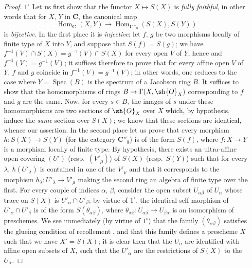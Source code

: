 \begin{proof}
$1^\circ$ Let us first show that the functor $X\mapsto S(X)$ is \emph{fully faithful}, in other words that for $X$, $Y$ in $\mathbf{C}$, the canonical map
\[
  \operatorname{Hom}_{\mathbf{C}}(X,Y)\to\operatorname{Hom}_{\mathbf{C}''_0}(S(X),S(Y))
\]
is \emph{bijective}.
In the first place it is \emph{injective}: let $f$, $g$ be two morphisms locally of finite type of $X$ into $Y$, and suppose that $S(f)=S(g)$; we have $f^{-1}(V)\cap S(X)=g^{-1}(V)\cap S(X)$ for every open $V$ of $Y$, hence  and  $f^{-1}(V)=g^{-1}(V)$; it suffices therefore to prove that for every affine open $V$ of $Y$, $f$ and $g$ coincide in $f^{-1}(V)=g^{-1}(V)$; in other words, one reduces to the case where $Y=\operatorname{Spec}(B)$ is the spectrum of a Jacobson ring $B$.
It suffices  to show that the homomorphisms of rings $B\to\Gamma(X,\sh{O}_X)$ corresponding to $f$ and $g$ are the same.
Now, for every $s\in B$, the images of $s$ under these homomorphisms are two sections of $\sh{O}_X$ over $X$ which, by hypothesis, induce the \emph{same} section over $S(X)$; we know  that these sections are identical, whence our assertion.
In the second place let us prove that every morphism $h:S(X)\to S(Y)$ (for the category $\mathbf{C}''_0$) is of the form $S(f)$, where $f:X\to Y$ is a morphism locally of finite type.
By hypothesis, there exists an ultra-affine open covering $(U')$ (resp.\ $(V'_\mu)$) of $S(X)$ (resp.\ $S(Y)$) such that for every $\lambda$, $h(U'_\lambda)$ is contained in one of the $V'_\mu$ and that it corresponds to the morphism $h_\lambda:U'_\lambda\to V'_\mu$ making the second ring an algebra of finite type over the first.
For every couple of indices $\alpha$, $\beta$, consider the open subset $U_{\alpha\beta}$ of $U_\alpha$ whose trace on $S(X)$ is $U'_\alpha\cap U'_\beta$; by virtue of $1^\circ$, the identical self-morphism of $U'_\alpha\cap U'_\beta$ is of the form $S(\theta_{\alpha\beta})$, where $\theta_{\alpha\beta}:U_{\alpha\beta}\to U_{\beta\alpha}$ is an isomorphism of preschemes.
We see immediately (by virtue of $1^\circ$) that the family $(\theta_{\alpha\beta})$ satisfies the glueing condition of recollement , and that this family defines a prescheme $X$ such that we have $X'=S(X)$; it is clear then that the $U_\alpha$ are identified with affine open subsets of $X$, such that the $U'_\alpha$ are the restrictions of $S(X)$ to the $U_\alpha$.


\end{proof}
